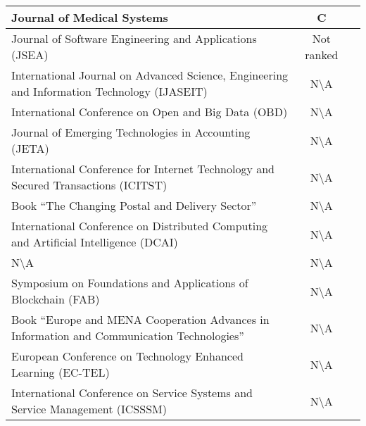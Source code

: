 \begin{longtable}{ |p{5cm}|c|c| }
	 \hline
	 Journal of Medical Systems & C & \citet{2016_Yue} \\ 
	 \hline
	 Journal of Software Engineering and Applications (JSEA) \nomenclature[P]{JSEA}{Journal of Software Engineering and Applications}  & Not ranked & \citet{2016_Bahga} \\ 
	 \hline
	 International Journal on Advanced Science, Engineering and Information Technology (IJASEIT) \nomenclature[P]{IJASEIT}{International Journal on Advanced Science, Engineering and Information Technology} & N\textbackslash A & \citet{2018_Alessandra} \\ 
	 \hline
	 International Conference on Open and Big Data (OBD) \nomenclature[P]{OBD}{International Conference on Open and Big Data} & N\textbackslash A & \citet{2016_Azaria} \\ 
	 \hline
	 Journal of Emerging Technologies in Accounting (JETA)\nomenclature[P]{JETA}{Journal of Emerging Technologies in Accounting} & N\textbackslash A & \citet{2017_Coyne} \\ 
	 \hline
	 International Conference for Internet Technology and Secured Transactions (ICITST)\nomenclature[P]{ICITST}{International Conference for Internet Technology and Secured Transactions}& N\textbackslash A & \citet{2015_Dennis} \\ 
	 \hline
	 Book \enquote{The Changing Postal and Delivery Sector} & N\textbackslash A & \citet{2017_Jaag} \\ 
	 \hline
	 International Conference on Distributed Computing and Artificial Intelligence (DCAI)\nomenclature[P]{DCAI}{International Conference on Distributed Computing and Artificial Intelligence} & N\textbackslash A & \citet{2016_Jacynycz} \\ 
	 \hline
	 N\textbackslash A & N\textbackslash A & \citet{2017_Liu} \\ 
	 \hline
	Symposium on Foundations and Applications of Blockchain (FAB) \nomenclature[P]{FAB}{Symposium on Foundations and Applications of Blockchain} & N\textbackslash A & \citet{2018_Lucena} \\ 
	 \hline
	 Book \enquote{Europe and MENA Cooperation Advances in Information and Communication Technologies} & N\textbackslash A & \citet{2017_Ouaddah} \\ 
	 \hline
	 European Conference on Technology Enhanced Learning (EC-TEL)\nomenclature[P]{EC-TEL}{European Conference on Technology Enhanced Learning} & N\textbackslash A & \citet{2016_Sharples} \\ 
	 \hline
	 International Conference on Service Systems and Service Management (ICSSSM)\nomenclature[P]{ICSSSM}{International Conference on Service Systems and Service Management} & N\textbackslash A & \citet{2016_Tian} \\ 
	 \hline
\end{longtable}
